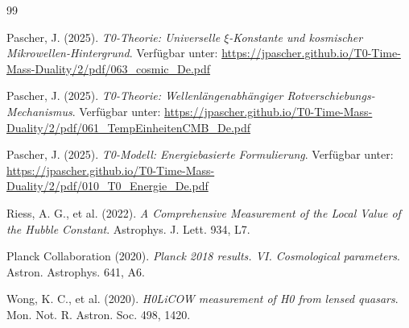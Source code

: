 \documentclass[12pt,a4paper]{article}
\begin{document}
	\begin{thebibliography}{99}
		
		Pascher, J. (2025). \textit{T0-Theorie: Universelle $\xi$-Konstante und kosmischer Mikrowellen-Hintergrund}. Verfügbar unter: \url{https://jpascher.github.io/T0-Time-Mass-Duality/2/pdf/063_cosmic_De.pdf}
		
		Pascher, J. (2025). \textit{T0-Theorie: Wellenlängenabhängiger Rotverschiebungs-Mechanismus}. Verfügbar unter: \url{https://jpascher.github.io/T0-Time-Mass-Duality/2/pdf/061_TempEinheitenCMB_De.pdf}
		
		Pascher, J. (2025). \textit{T0-Modell: Energiebasierte Formulierung}. Verfügbar unter: \url{https://jpascher.github.io/T0-Time-Mass-Duality/2/pdf/010_T0_Energie_De.pdf}
		
		Riess, A. G., et al. (2022). \textit{A Comprehensive Measurement of the Local Value of the Hubble Constant}. Astrophys. J. Lett. 934, L7.
		
		Planck Collaboration (2020). \textit{Planck 2018 results. VI. Cosmological parameters}. Astron. Astrophys. 641, A6.
		
		Wong, K. C., et al. (2020). \textit{H0LiCOW measurement of H0 from lensed quasars}. Mon. Not. R. Astron. Soc. 498, 1420.
		
	\end{thebibliography}
	
\end{document}
